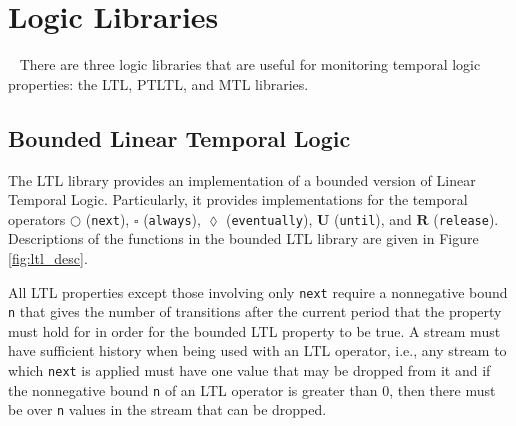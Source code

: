 \newcommand{\previous}{\overset{\leftarrow}{\bigcirc}}
\newcommand{\alwaysBeen}{\overset{\leftarrow}{\square}}
\newcommand{\eventuallyPrev}{\overset{\leftarrow}{\lozenge}}

\section{Logic Libraries}~\label{sec:logic}
There are three logic libraries that are useful for monitoring temporal logic
properties: the LTL, PTLTL, and MTL libraries.

\subsection{Bounded Linear Temporal Logic}
The LTL library provides an implementation of a bounded version of Linear
Temporal Logic. Particularly, it provides implementations for the temporal
operators $\bigcirc$ ({\tt next}), $\square$ ({\tt always}),
$\lozenge$ ({\tt eventually}), $\mathbf{U}$ ({\tt until}), and
$\mathbf{R}$ ({\tt release}). Descriptions of the functions in the
bounded LTL library are given in Figure \ref{fig:ltl_desc}.

All LTL properties except those involving only {\tt next}
require a nonnegative bound {\tt n} that gives the number of transitions
after the current period that the property must hold for in order
for the bounded LTL property to be true.
A stream must have sufficient history when being used with
an LTL operator, i.e., any stream to which {\tt next} is applied must
have one value that may be dropped from it and if the nonnegative bound
{\tt n} of an LTL operator is greater than 0, then there must be over
{\tt n} values in the stream that can be dropped.

